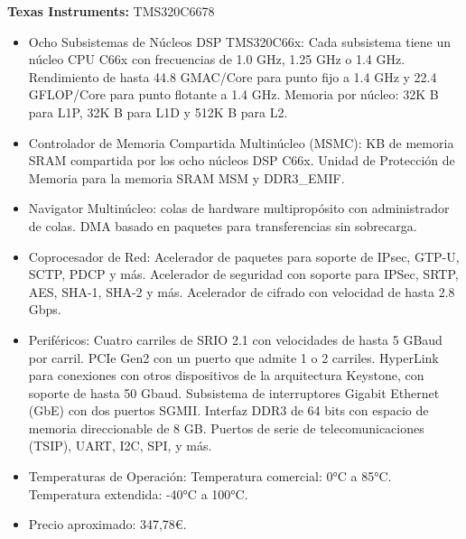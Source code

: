 \documentclass[11pt]{report}
\begin{document}
\textbf{Texas Instruments:} TMS320C6678
\begin{itemize}
  \item Ocho Subsistemas de Núcleos DSP TMS320C66x:
        \subitem Cada subsistema tiene un núcleo CPU C66x con frecuencias de 1.0 GHz, 1.25 GHz o 1.4 GHz.
        \subitem Rendimiento de hasta 44.8 GMAC/Core para punto fijo a 1.4 GHz y 22.4 GFLOP/Core para punto flotante a 1.4 GHz.
        \subitem Memoria por núcleo: 32K B para L1P, 32K B para L1D y 512K B para L2.

  \item Controlador de Memoria Compartida Multinúcleo (MSMC):
         KB de memoria SRAM compartida por los ocho núcleos DSP C66x.
        \subitem Unidad de Protección de Memoria para la memoria SRAM MSM y DDR3\_EMIF.

        \newpage

  \item Navigator Multinúcleo:
         colas de hardware multipropósito con administrador de colas.
        \subitem DMA basado en paquetes para transferencias sin sobrecarga.

  \item Coprocesador de Red:
        \subitem Acelerador de paquetes para soporte de IPsec, GTP-U, SCTP, PDCP y más.
        \subitem Acelerador de seguridad con soporte para IPSec, SRTP, AES, SHA-1, SHA-2 y más.
        \subitem Acelerador de cifrado con velocidad de hasta 2.8 Gbps.

  \item Periféricos:
        \subitem Cuatro carriles de SRIO 2.1 con velocidades de hasta 5 GBaud por carril.
        \subitem PCIe Gen2 con un puerto que admite 1 o 2 carriles.
        \subitem HyperLink para conexiones con otros dispositivos de la arquitectura Keystone, con soporte de hasta 50 Gbaud.
        \subitem Subsistema de interruptores Gigabit Ethernet (GbE) con dos puertos SGMII.
        \subitem Interfaz DDR3 de 64 bits con espacio de memoria direccionable de 8 GB.
        \subitem Puertos de serie de telecomunicaciones (TSIP), UART, I2C, SPI, y más.

  \item Temperaturas de Operación:
        \subitem Temperatura comercial: 0°C a 85°C.
        \subitem Temperatura extendida: -40°C a 100°C.

  \item Precio aproximado: 347,78\euro.
\end{itemize}
\end{document}
